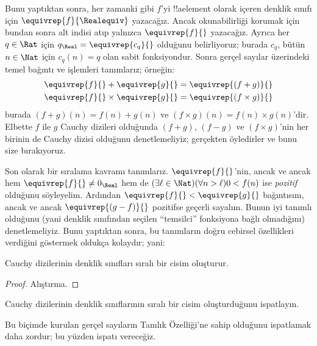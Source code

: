 Bunu yaptıktan sonra, her zamanki gibi $f$'yi !!a{element} olarak içeren
denklik sınıfı için $\equivrep{f}{\Realequiv}$ yazacağız. Ancak okunabilirliği
korumak için bundan sonra alt indisi atıp yalnızca $\equivrep{f}{}$ yazacağız.
Ayrıca her $q \in \Rat$ için
$q_{\Real} = \equivrep{c_{q}}{}$ olduğunu belirliyoruz; burada $c_q$, bütün
$n \in \Nat$ için $c_q(n) = q$ olan sabit fonksiyondur. Sonra gerçel sayılar
üzerindeki temel bağıntı ve işlemleri tanımlarız; örneğin:
\begin{align*}
	\equivrep{f}{} + \equivrep{g}{} &= 	\equivrep{(f + g)}{} \\
	\equivrep{f}{} \times 	\equivrep{g}{} &= \equivrep{(f \times g)}{}
\end{align*}
burada $(f + g)(n) = f(n) + g(n)$ ve
$(f \times g)(n) = f(n) \times g(n)$'dir. Elbette $f$ ile $g$ Cauchy
dizileri olduğunda $(f + g)$, $(f-g)$ ve $(f\times g)$'nin her birinin de
Cauchy dizisi olduğunu denetlemeliyiz; gerçekten öyledirler ve bunu size
bırakıyoruz.

Son olarak bir sıralama kavramı tanımlarız. $\equivrep{f}{}$'nin, ancak ve
ancak hem $\equivrep{f}{}\neq 0_\Real$ hem de
$(\exists \ell \in \Nat)(\forall n > \ell)0 < f(n)$ ise \emph{pozitif}
olduğunu söyleyelim. Ardından $\equivrep{f}{} < \equivrep{g}{}$ bağıntısını,
ancak ve ancak $\equivrep{(g - f)}{}$ pozitifse geçerli sayalım. Bunun iyi
tanımlı olduğunu (yani denklik sınıfından seçilen “temsilci” fonksiyona bağlı
olmadığını) denetlemeliyiz.
Bunu yaptıktan sonra, bu tanımların doğru cebirsel özellikleri verdiğini
göstermek oldukça kolaydır; yani:
\begin{thm}
Cauchy dizilerinin denklik sınıfları sıralı bir cisim oluşturur.
\end{thm}

\begin{proof}
Alıştırma.
\end{proof}

\begin{prob}
Cauchy dizilerinin denklik sınıflarının sıralı bir cisim oluşturduğunu
ispatlayın.
\end{prob}

Bu biçimde kurulan gerçel sayıların Tamlık Özelliği'ne sahip olduğunu ispatlamak
daha zordur; bu yüzden ispatı vereceğiz.

